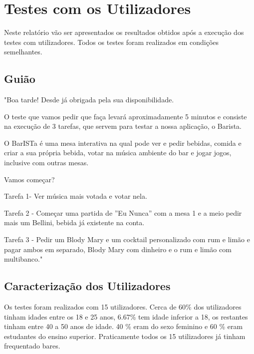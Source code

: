 \documentclass{article}
\begin{document}
\section*{Testes com os Utilizadores}
Neste relatório vão ser apresentados os resultados obtidos após a execução dos testes com utilizadores. Todos os testes foram realizados em condições semelhantes.

\subsection*{Guião}
"Boa tarde! Desde já obrigada pela sua disponibilidade.

O teste que vamos pedir que faça levará aproximadamente 5 minutos e consiste na execução de 3 tarefas, que servem para testar a nossa aplicação, o Barista.

O BarISTa é uma mesa interativa na qual pode ver e pedir bebidas, comida e criar a sua própria bebida, votar na música ambiente do bar e jogar jogos, inclusive com outras mesas.

Vamos começar? 

Tarefa 1- Ver música mais votada e votar nela. 

Tarefa 2 - Começar uma partida de ”Eu Nunca” com a mesa 1 e a meio pedir mais um Bellini, bebida já existente na conta.
 
Tarefa 3 - Pedir um Blody Mary e um cocktail personalizado com rum e limão e pagar ambos em separado, Blody Mary com dinheiro e o rum e limão com multibanco." 


\subsection*{Caracterização dos Utilizadores}
Os testes foram realizados com 15 utilizadores.
Cerca de 60\% dos utilizadores tinham idades entre os 18 e 25 anos, 6.67\% tem idade inferior a 18, os restantes tinham entre 40 a 50 anos de idade. 40 \% eram do sexo feminino e 60 \% eram estudantes do ensino superior.
Praticamente todos os 15 utilizadores já tinham frequentado bares.
\end{document}
